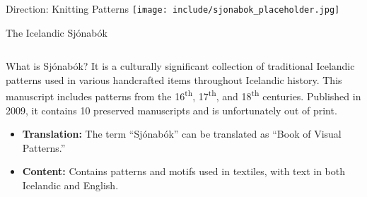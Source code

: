 \documentclass[
    NAME={Dr. Helga Ingimundardóttir},
    EMAIL={helgaingim@hi.is},
    FACULTY={Industrial Engineering},
    TITLE={HiDef Textiles: Reviving Tradition with Innovation},
    SUBTITLE={Empowering Creativity and Sustainability in Textile Production through Digital Transformation},
    SEMINAR={Reykjavík DataBeers},
    DATE={January 25, 2025},
    WIDE={true}
]{HI-LaTeX/hi-beamer}
\begin{document}
\begin{frame}{Direction: Knitting Patterns}
\centering
\texttt{[image: include/sjonabok\_placeholder.jpg]}
\end{frame}

    \begin{frame}[allowframebreaks]{The Icelandic Sjónabók}

        \begin{columns}
            \begin{column}{0.7\textwidth}
                \begin{block}{What is Sjónabók?}
                    It is a culturally significant collection of traditional Icelandic patterns used in various handcrafted items throughout Icelandic history. This manuscript includes patterns from the 16\textsuperscript{th}, 17\textsuperscript{th}, and 18\textsuperscript{th} centuries. Published in 2009, it contains 10 preserved manuscripts and is unfortunately out of print.
                \end{block}

                \begin{itemize}
                    \item \textbf{Translation:} The term ``Sjónabók'' can be translated as ``Book of Visual Patterns.''
                    \item \textbf{Content:} Contains patterns and motifs used in textiles, with text in both Icelandic and English.
                \end{itemize}
            \end{column}


\end{columns}
\end{frame}
\end{document}
